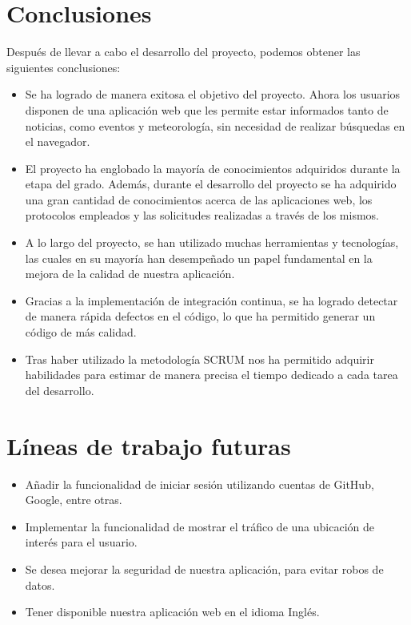 
\section{Conclusiones}

Después de llevar a cabo el desarrollo del proyecto, podemos obtener las siguientes conclusiones:

\begin{itemize}
    \item Se ha logrado de manera exitosa el objetivo del proyecto. Ahora los usuarios disponen de una aplicación web que les permite estar informados tanto de noticias, como eventos y meteorología, sin necesidad de realizar búsquedas en el navegador.
    \item El proyecto ha englobado la mayoría de conocimientos adquiridos durante la etapa del grado. Además, durante el desarrollo del proyecto se ha adquirido una gran cantidad de conocimientos acerca de las aplicaciones web, los protocolos empleados y las solicitudes realizadas a través de los mismos. 
    \item A lo largo del proyecto, se han utilizado muchas herramientas y tecnologías, las cuales en su mayoría han desempeñado un papel fundamental en la mejora de la calidad de nuestra aplicación.
    \item Gracias a la implementación de integración continua, se ha logrado detectar de manera rápida defectos en el código, lo que ha permitido generar un código de más calidad.
    \item Tras haber utilizado la metodología SCRUM nos ha permitido adquirir habilidades para estimar de manera precisa el tiempo dedicado a cada tarea del desarrollo.
\end{itemize}

\section{Líneas de trabajo futuras}

\begin{itemize}
    \item Añadir la funcionalidad de iniciar sesión utilizando cuentas de GitHub, Google, entre otras.
    \item Implementar la funcionalidad de mostrar el tráfico de una ubicación de interés para el usuario.
    \item Se desea mejorar la seguridad de nuestra aplicación, para evitar robos de datos.
    \item Tener disponible nuestra aplicación web en el idioma Inglés. 
\end{itemize}